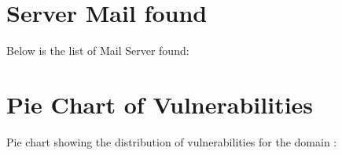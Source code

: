 \documentclass{article}
\begin{document}
\section{Server Mail found}

Below is the list of Mail Server found:


\clearpage

\section{Pie Chart of Vulnerabilities}

\noindent Pie chart showing the distribution of vulnerabilities for the domain :
\end{document}
